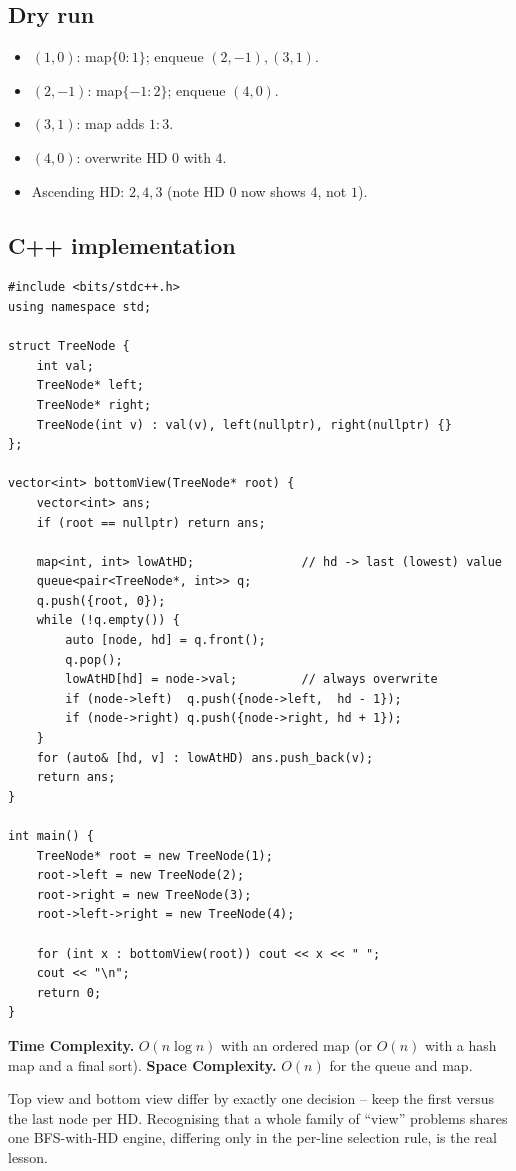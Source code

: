 \subsection*{Dry run}


\begin{itemize}
  \item $(1,0)$: map$\{0\!:\!1\}$; enqueue $(2,-1),(3,1)$.
  \item $(2,-1)$: map$\{-1\!:\!2\}$; enqueue $(4,0)$.
  \item $(3,1)$: map adds $1\!:\!3$.
  \item $(4,0)$: overwrite HD $0$ with $4$.
  \item Ascending HD: $2,4,3$ (note HD $0$ now shows $4$, not $1$).
\end{itemize}

\subsection*{C++ implementation}

\begin{lstlisting}
#include <bits/stdc++.h>
using namespace std;

struct TreeNode {
    int val;
    TreeNode* left;
    TreeNode* right;
    TreeNode(int v) : val(v), left(nullptr), right(nullptr) {}
};

vector<int> bottomView(TreeNode* root) {
    vector<int> ans;
    if (root == nullptr) return ans;

    map<int, int> lowAtHD;               // hd -> last (lowest) value
    queue<pair<TreeNode*, int>> q;
    q.push({root, 0});
    while (!q.empty()) {
        auto [node, hd] = q.front();
        q.pop();
        lowAtHD[hd] = node->val;         // always overwrite
        if (node->left)  q.push({node->left,  hd - 1});
        if (node->right) q.push({node->right, hd + 1});
    }
    for (auto& [hd, v] : lowAtHD) ans.push_back(v);
    return ans;
}

int main() {
    TreeNode* root = new TreeNode(1);
    root->left = new TreeNode(2);
    root->right = new TreeNode(3);
    root->left->right = new TreeNode(4);

    for (int x : bottomView(root)) cout << x << " ";
    cout << "\n";
    return 0;
}
\end{lstlisting}

\begin{complexitybox}
\textbf{Time Complexity.} $O(n\log n)$ with an ordered map (or $O(n)$ with
a hash map and a final sort). \textbf{Space Complexity.} $O(n)$ for the
queue and map.
\end{complexitybox}

\begin{takeawaybox}
Top view and bottom view differ by exactly one decision -- keep the first
versus the last node per HD. Recognising that a whole family of ``view''
problems shares one BFS-with-HD engine, differing only in the per-line
selection rule, is the real lesson.
\end{takeawaybox}
